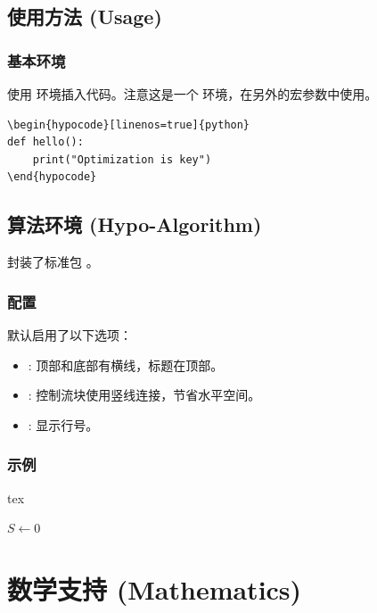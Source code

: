 \documentclass[
    outputdir=build,
    colorscheme=Tech,
    shorthand=true,
    code=true,
    fontset=lit
]{Hypo-Note}
\begin{document}
\section{使用方法 (Usage)}

\subsection{基本环境}
使用  环境插入代码。注意这是一个  环境，在另外的宏参数中使用。

\begin{verbatim}
\begin{hypocode}[linenos=true]{python}
def hello():
    print("Optimization is key")
\end{hypocode}
\end{verbatim}

\section{算法环境 (Hypo-Algorithm)}
封装了标准包 。

\subsection{配置}
默认启用了以下选项：
\begin{itemize}
    \item {}: 顶部和底部有横线，标题在顶部。
    \item {}: 控制流块使用竖线连接，节省水平空间。
    \item {}: 显示行号。
\end{itemize}

\subsection{示例}
\begin{hypocode}{tex}
\begin{algorithm}[H]
    \caption{求和算法}
    $S \leftarrow 0$\;
\end{algorithm}
\end{hypocode}

\chapter{数学支持 (Mathematics)}
\end{document}
